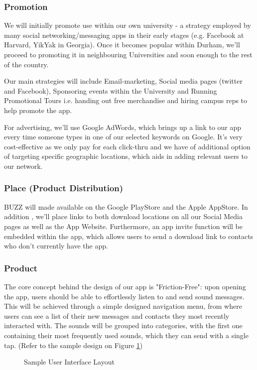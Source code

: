 \documentclass[12pt]{article}
\begin{document}
\subsubsection*{Promotion}\label{sec:Promotion}
We will initially promote use within our own university - a strategy employed by many social networking/messaging apps in their early stages (e.g. Facebook at Harvard, YikYak in Georgia). Once it becomes popular within Durham, we'll proceed to promoting it in neighbouring Universities and soon enough to the rest of the country.
 
Our main strategies will include  Email-marketing, Social media pages (twitter and Facebook), Sponsoring events within the University and Running Promotional Tours i.e. handing out free merchandise and hiring campus reps to help promote the app.
 
For advertising, we'll use Google AdWords, which brings up a link to our app every time someone types in one of our selected keywords on Google. It's very cost-effective as we only pay for each click-thru and we have of additional option of targeting specific geographic locations, which aids in adding relevant users to our network.

\subsubsection*{Place (Product Distribution)}
BUZZ will made available on the Google PlayStore and the Apple AppStore. In addition , we'll place links to both download locations on all our Social Media pages as well as the App Website. Furthermore, an app invite function will be embedded within the app, which allows users to send a download link to contacts who don't currently have the app.

\subsubsection*{Product}
The core concept behind the design of our app is "Friction-Free": upon opening the app, users should be able to effortlessly listen to and send sound messages. This will be achieved through a simple designed navigation menu, from where users can see a list of their new messages and contacts they most recently interacted with. The sounds will be grouped into categories, with the first one containing their most frequently used sounds, which they can send with a single tap. (Refer to the sample design on Figure \ref{fig:ui})

\begin{figure}[!h]
    \centering
    \caption{Sample User Interface Layout}
    \label{fig:ui}
\end{figure}
\end{document}
